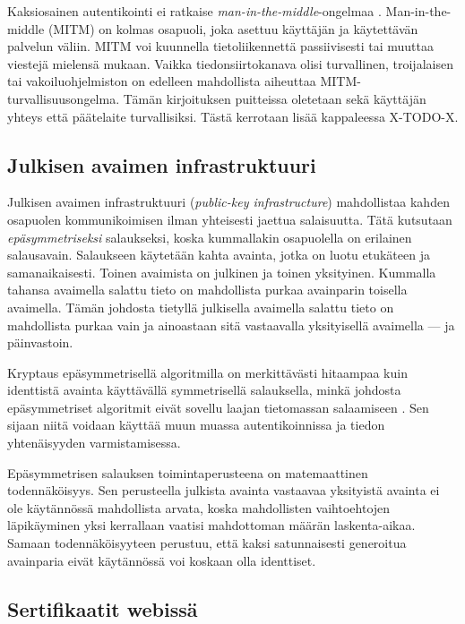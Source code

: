 \documentclass[english,gradu]{tktltiki}
\begin{document}
Kaksiosainen autentikointi ei ratkaise \emph{man-in-the-middle}-ongelmaa \cite{schneier_2factor_2005}.
Man-in-the-middle (MITM) on kolmas osapuoli, joka asettuu käyttäjän ja käytettävän palvelun väliin. MITM voi kuunnella tietoliikennettä passiivisesti tai muuttaa viestejä mielensä mukaan. Vaikka tiedonsiirtokanava olisi turvallinen, troijalaisen tai vakoiluohjelmiston on edelleen mahdollista aiheuttaa MITM-turvallisuusongelma. Tämän kirjoituksen puitteissa oletetaan sekä käyttäjän yhteys että päätelaite turvallisiksi. Tästä kerrotaan lisää kappaleessa X-TODO-X.


\subsection{Julkisen avaimen infrastruktuuri}

Julkisen avaimen infrastruktuuri (\emph{public-key infrastructure}) mahdollistaa kahden osapuolen kommunikoimisen ilman yhteisesti jaettua salaisuutta. Tätä kutsutaan \emph{epäsymmetriseksi} salaukseksi, koska kummallakin osapuolella on erilainen salausavain. Salaukseen käytetään kahta avainta, jotka on luotu etukäteen ja samanaikaisesti. Toinen avaimista on julkinen ja toinen yksityinen. Kummalla tahansa avaimella salattu tieto on mahdollista purkaa avainparin toisella avaimella. Tämän johdosta tietyllä julkisella avaimella salattu tieto on mahdollista purkaa vain ja ainoastaan sitä vastaavalla yksityisellä avaimella --- ja päinvastoin.

Kryptaus epäsymmetrisellä algoritmilla on merkittävästi hitaampaa kuin identtistä avainta käyttävällä symmetrisellä salauksella, minkä johdosta epäsymmetriset algoritmit eivät sovellu laajan tietomassan salaamiseen \cite{nist_pki_intro, NIST_SP800-63}. Sen sijaan niitä voidaan käyttää muun muassa autentikoinnissa ja tiedon yhtenäisyyden varmistamisessa.

Epäsymmetrisen salauksen toimintaperusteena on matemaattinen todennäköisyys. Sen perusteella julkista avainta vastaavaa yksityistä avainta ei ole käytännössä mahdollista arvata, koska mahdollisten vaihtoehtojen läpikäyminen yksi kerrallaan vaatisi mahdottoman määrän laskenta-aikaa. Samaan todennäköisyyteen perustuu, että kaksi satunnaisesti generoitua avainparia eivät käytännössä voi koskaan olla identtiset.


\subsection{Sertifikaatit webissä}
\end{document}
